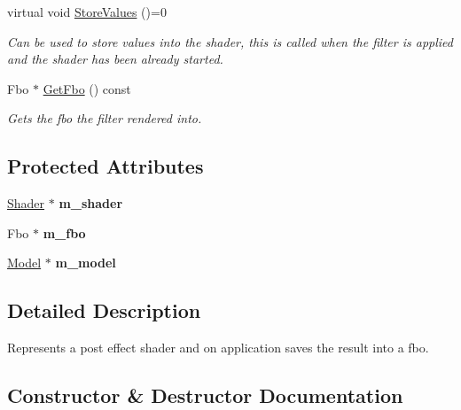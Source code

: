 \begin{DoxyCompactItemize}
virtual void \hyperlink{class_flounder_1_1_i_post_filter_a20420ec0a9bac67437740552bea9ab74}{Store\+Values} ()=0
\begin{DoxyCompactList}\small\item\em Can be used to store values into the shader, this is called when the filter is applied and the shader has been already started. \end{DoxyCompactList}\item 
Fbo $\ast$ \hyperlink{class_flounder_1_1_i_post_filter_a9b48c22748de5b609615aa8f4a6ee8ab}{Get\+Fbo} () const
\begin{DoxyCompactList}\small\item\em Gets the fbo the filter rendered into. \end{DoxyCompactList}\end{DoxyCompactItemize}
\subsection*{Protected Attributes}
\begin{DoxyCompactItemize}
\item 
\mbox{\label{class_flounder_1_1_i_post_filter_ac3984987ec5a563a52de5f1da402d93d}} 
\hyperlink{class_flounder_1_1_shader}{Shader} $\ast$ {\bfseries m\+\_\+shader}
\item 
\mbox{\label{class_flounder_1_1_i_post_filter_a5eed66e608ca135f4ebf8a7b9179575b}} 
Fbo $\ast$ {\bfseries m\+\_\+fbo}
\item 
\mbox{\label{class_flounder_1_1_i_post_filter_a282f7f9169a179e5385192e4dd553fef}} 
\hyperlink{class_flounder_1_1_model}{Model} $\ast$ {\bfseries m\+\_\+model}
\end{DoxyCompactItemize}


\subsection{Detailed Description}
Represents a post effect shader and on application saves the result into a fbo. 



\subsection{Constructor \& Destructor Documentation}
\mbox{\label{class_flounder_1_1_i_post_filter_a5a145e57372c65d47af3c8c6f45feb76}} 
